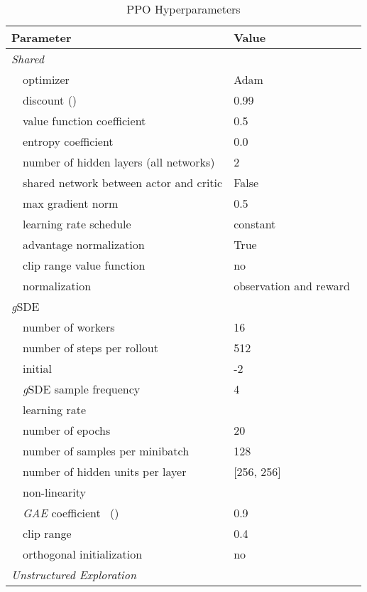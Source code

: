 \documentclass{article}
\newcommand{\ourSDE}{\textit{g}\textsc{SDE}\xspace}
\newcommand{\ppo}{\textsc{PPO}\xspace}
\begin{document}
\begin{table}[h]
\renewcommand{\arraystretch}{1.1}
\centering
\caption{\ppo Hyperparameters}
\label{tab:ppo_shared_params}
\vspace{1mm}
  \begin{tabular}{@{}l l| l@{}}
    \toprule
    \multicolumn{2}{l|}{Parameter} &  Value\\
    \midrule
    \multicolumn{2}{l|}{\textit{Shared}}& \\
    & optimizer & Adam~\citep{kingma2014adam}\\
    & discount () &  0.99\\
    & value function coefficient & 0.5\\
    & entropy coefficient & 0.0\\
    & number of hidden layers (all networks) & 2\\
    & shared network between actor and critic & False\\
    & max gradient norm & 0.5\\
    & learning rate schedule & constant \\
    & advantage normalization~\citep{hill2018stable} & True \\
    & clip range value function~\citep{engstrom2020implementation} & no \\
    & normalization & observation and reward~\citep{hill2018stable}\\
    \midrule
    \multicolumn{2}{l|}{\ourSDE}& \\
    & number of workers &  16\\
    & number of steps per rollout &  512\\
    & initial  & -2\\
    & \ourSDE sample frequency & 4\\
    & learning rate & \\
    & number of epochs & 20\\
    & number of samples per minibatch & 128\\
    & number of hidden units per layer & [256, 256]\\
    & non-linearity & \\
    & \textit{GAE} coefficient~\citep{schulman2015high} () &  0.9\\
    & clip range & 0.4 \\
    & orthogonal initialization~\citep{engstrom2020implementation} & no \\
    \midrule
    \multicolumn{2}{l|}{\textit{Unstructured Exploration}}& \\

\end{tabular}
\end{table}
\end{document}
